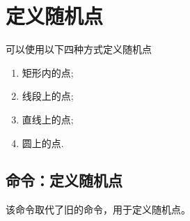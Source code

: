 \documentclass[../main.tex]{subfiles}
\begin{document}
\section{定义随机点}
可以使用以下四种方式定义随机点

\begin{enumerate}
\item 矩形内的点;
\item 线段上的点;
\item 直线上的点;
\item 圆上的点.
\end{enumerate}

\subsection{命令：定义随机点}

该命令取代了旧的命令，用于定义随机点。
\end{document}
